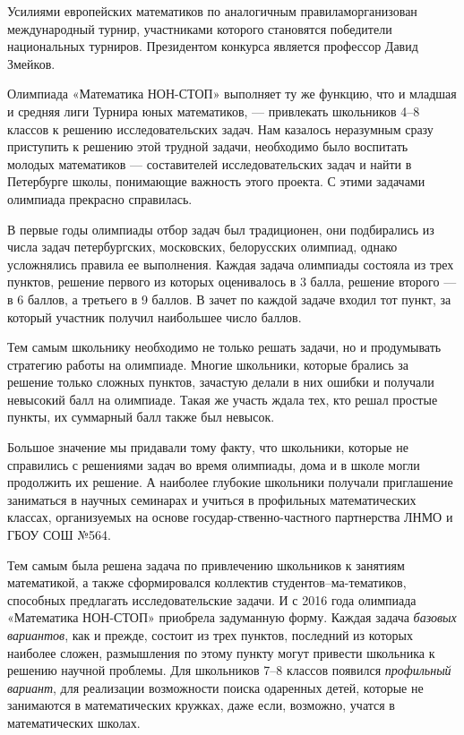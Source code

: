\ms\abz Усилиями европейских математиков по аналогичным правилам\linebreak организован международный турнир, участниками которого становятся победители национальных турниров. Президентом конкурса является профессор Давид Змейков.  

\ms\abz Олимпиада «Математика НОН-СТОП» выполняет ту же функцию, что и младшая и средняя лиги Турнира юных математиков, — привлекать школьников 4–8 классов к решению исследовательских задач. Нам казалось неразумным сразу приступить к решению этой трудной задачи, необходимо было воспитать молодых математиков — составителей  исследовательских задач и найти в Петербурге школы, понимающие важность этого проекта. С этими задачами олимпиада прекрасно справилась.

\ms\abz В первые годы олимпиады отбор задач был традиционен, они подбирались из числа задач петербургских, московских, белорусских олимпиад, однако усложнялись правила ее выполнения. Каждая задача олимпиады состояла из трех пунктов, решение первого из которых оценивалось в 3 балла, решение второго — в 6 баллов, а третьего в 9 баллов. В зачет по каждой задаче входил тот пункт, за который участник получил наибольшее число баллов.

\ms\abz Тем самым школьнику необходимо не только решать задачи, но и продумывать стратегию работы на олимпиаде. Многие школьники, которые брались за решение только сложных пунктов, зачастую делали в них ошибки и получали невысокий балл на олимпиаде. Такая же участь ждала тех, кто решал простые пункты, их суммарный балл также был невысок.

\ms\abz Большое значение мы придавали тому факту, что школьники, которые не справились с решениями задач во время олимпиады, дома и в школе могли продолжить их решение. А наиболее глубокие школьники получали приглашение заниматься в научных семинарах и учиться в профильных математических классах, организуемых на основе государ-\linebreak ственно-частного партнерства ЛНМО и ГБОУ СОШ №564.

\ms\abz Тем самым была решена задача по привлечению школьников к занятиям математикой, а также сформировался коллектив студентов–ма-\linebreak тематиков, способных предлагать исследовательские задачи. И с 2016 года олимпиада «Математика НОН-СТОП» приобрела задуманную форму. Каждая задача {\itshape базовых вариантов}, как и прежде, состоит из трех пунктов, последний из которых наиболее сложен, размышления по этому пункту могут привести школьника к решению научной проблемы. Для школьников 7–8 классов появился {\itshape профильный вариант}, для реализации возможности поиска одаренных детей, которые не занимаются в математических кружках, даже если, возможно, учатся в математических школах.

